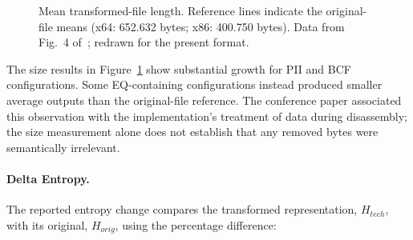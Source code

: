 \documentclass[runningheads]{llncs}
\providecommand{\Description}[1]{}
\begin{document}
\begin{figure}[tbp]
\Description{Mean transformed-file length. Reference lines indicate the original-file means (x64: 652.632 bytes; x86: 400.750 bytes). Orange circles identify x64 and blue squares identify x86.}
\caption{Mean transformed-file length. Reference lines indicate the original-file means (x64: 652.632 bytes; x86: 400.750 bytes). Data from Fig.~4 of~\cite{zone_secrypt_2026}; redrawn for the present format.}
\label{fig:length_comparison}
\end{figure}

The size results in Figure~\ref{fig:length_comparison} show substantial growth for PII and BCF configurations. Some EQ-containing configurations instead produced smaller average outputs than the original-file reference. The conference paper associated this observation with the implementation's treatment of data during disassembly; the size measurement alone does not establish that any removed bytes were semantically irrelevant.

\paragraph{Delta Entropy.}
The reported entropy change compares the transformed representation, $H_{tech}$, with its original, $H_{orig}$, using the percentage difference:
\end{document}
